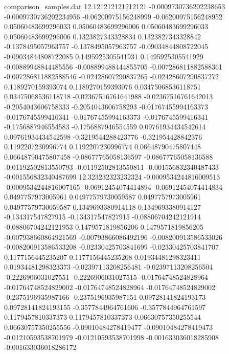 \begin{filecontents}{comparison_samples.dat}
12.121212121212121  -0.0009730736202238653  -0.0009730736202234956  -0.06200975156248999   -0.06200975156248952   0.05060483699296033    0.05060483699296006    0.05060483699296033    0.05060483699296006    0.1323827343328834     0.1323827343328842     -0.1378495057963757     -0.1378495057963757     -0.09034844808722045   -0.09034844808722085   0.1495925305541931      0.1495925305541929      -0.00889948844485556    -0.008899488444855705   -0.007286811882588361   -0.007286811882588546   -0.02428607290837265    -0.02428607290837272    0.1189270159393074      0.1189270159393076      0.03475068536118751     0.03475068536118718     -0.02367516761641988   -0.02367516761642013   -0.2054043606758333    -0.2054043606758293    -0.01767455994163373    -0.0176745599416341     -0.01767455994163373    -0.0176745599416341     -0.1756887946554583    -0.1756887946554559    0.09761934434542614     0.09761934434542598     -0.3219544288423776    -0.321954428842376     0.1192207230996774      0.1192207230996774      0.06648790475807448     0.06648790475807458     -0.08677765058136597   -0.08677765058136588   -0.01192502813550793   -0.01192502813550811   -0.001556832340487433   -0.001556832340487699 
12.323232323232324  -0.0009534244816009513  -0.0009534244816007165  -0.06912454074414894   -0.06912454074414834   0.0497757973005961     0.04977579730059587    0.0497757973005961     0.04977579730059587    0.1349693380914118     0.1349693380914127     -0.134317547827915      -0.134317547827915      -0.08806704242121914   -0.08806704242121953   0.1479571819856206      0.1479571819856205      -0.007938660864921569   -0.00793866086492196    -0.008200913586533026   -0.008200913586533208   -0.02330425703841699    -0.02330425703841707    0.1177156445235207      0.1177156445235208      0.01934481298323411     0.01934481298323373     -0.02397113208256481   -0.02397113208256504   -0.2226906031027551    -0.2226906031027515    -0.01764748524828964    -0.01764748524829002    -0.01764748524828964    -0.01764748524829002    -0.2375196935987166    -0.2375196935987151    0.09728141824193173     0.09728141824193155     -0.3577844964761606    -0.3577844964761597    0.1179457810337373      0.1179457810337373      0.06630757350255544     0.06630757350255556     -0.09010484278419477   -0.09010484278419473   -0.01210593538701979   -0.01210593538701998   -0.001633036018285908   -0.001633036018286172 

\end{filecontents}
